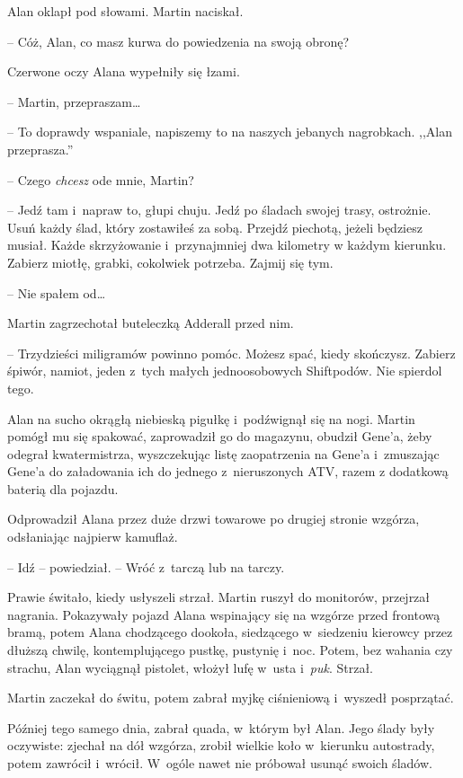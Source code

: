 \documentclass[oneside,polish,11pt,sfheadings]{mwbk}
\begin{document}
Alan oklapł pod słowami. Martin naciskał. 

-- Cóż, Alan, co masz kurwa do
powiedzenia na swoją obronę?

Czerwone oczy Alana wypełniły się łzami. 

-- Martin, przepraszam\ldots 

-- To doprawdy wspaniale, napiszemy to na naszych jebanych nagrobkach.
,,Alan przeprasza.''

-- Czego \textit{chcesz} ode mnie, Martin?

-- Jedź tam i~napraw to, głupi chuju. Jedź po śladach swojej trasy,
ostrożnie. Usuń każdy ślad, który zostawiłeś za sobą. Przejdź piechotą,
jeżeli będziesz musiał. Każde skrzyżowanie i~przynajmniej dwa kilometry
w każdym kierunku. Zabierz miotłę, grabki, cokolwiek potrzeba. Zajmij
się tym.

-- Nie spałem od\ldots 

Martin zagrzechotał buteleczką Adderall przed nim. 

-- Trzydzieści
miligramów powinno pomóc. Możesz spać, kiedy skończysz. Zabierz śpiwór,
namiot, jeden z~tych małych jednoosobowych Shiftpodów. Nie spierdol
tego.

Alan na sucho okrągłą niebieską pigułkę i~podźwignął się na nogi. Martin
pomógł mu się spakować, zaprowadził go do magazynu, obudził Gene'a, żeby
odegrał kwatermistrza, wyszczekując listę zaopatrzenia na Gene'a i~zmuszając Gene'a do załadowania ich do jednego z~nieruszonych ATV, razem
z dodatkową baterią dla pojazdu.

Odprowadził Alana przez duże drzwi towarowe po drugiej stronie wzgórza,
odsłaniając najpierw kamuflaż. 

-- Idź -- powiedział. -- Wróć z~tarczą lub
na tarczy.

Prawie świtało, kiedy usłyszeli strzał. Martin ruszył do monitorów,
przejrzał nagrania. Pokazywały pojazd Alana wspinający się na wzgórze
przed frontową bramą, potem Alana chodzącego dookoła, siedzącego w~siedzeniu kierowcy przez dłuższą chwilę, kontemplującego pustkę, pustynię i~noc. Potem, bez wahania czy strachu, Alan wyciągnął pistolet, włożył
lufę w~usta i~\textit{puk}. Strzał.

Martin zaczekał do świtu, potem zabrał myjkę ciśnieniową i~wyszedł
posprzątać.

Później tego samego dnia, zabrał quada, w~którym był Alan. Jego ślady
były oczywiste: zjechał na dół wzgórza, zrobił wielkie koło w~kierunku
autostrady, potem zawrócił i~wrócił. W~ogóle nawet nie próbował usunąć
swoich śladów.
\end{document}
